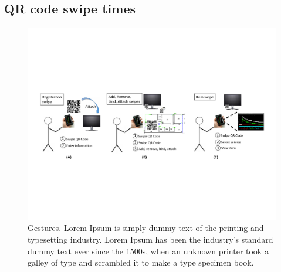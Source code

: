 \subsection{QR code swipe times}
\begin{figure}[htb!]
\begin{center}
\includegraphics[width=\textwidth]{figs/swipes}
\caption{Gestures. Lorem Ipsum is simply dummy text of the printing and typesetting industry. Lorem Ipsum has 
been the industry's standard dummy text ever since the 1500s, when an unknown printer took a galley of 
type and scrambled it to make a type specimen book.  }
\label{fig:gestures}
\end{center}
\end{figure}

